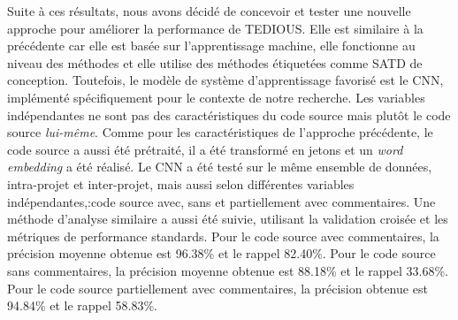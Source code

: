 Suite \`{a} ces r\'{e}sultats, nous avons d\'{e}cid\'{e} de concevoir et tester une nouvelle approche pour am\'{e}liorer la performance de \ac{TEDIOUS}. Elle est similaire \`{a} la pr\'{e}c\'{e}dente car elle est bas\'{e}e sur l'apprentissage machine, elle fonctionne au niveau des m\'{e}thodes et elle utilise des m\'{e}thodes \'{e}tiquet\'{e}es comme \ac{SATD} de conception. Toutefois, le mod\`{e}le de syst\`{e}me d'apprentissage favoris\'{e} est le \ac{CNN}, impl\'{e}ment\'{e} sp\'{e}cifiquement pour le contexte de notre recherche. Les variables ind\'{e}pendantes ne sont pas des caract\'{e}ristiques du code source mais plut\^{o}t le code source \emph{lui-m\^{e}me}. Comme pour les caract\'{e}ristiques de l'approche pr\'{e}c\'{e}dente, le code source a aussi \'{e}t\'{e} pr\'{e}trait\'{e}, il a \'{e}t\'{e} transform\'{e} en jetons et un \emph{word embedding} a \'{e}t\'{e} r\'{e}alis\'{e}. Le \ac{CNN} a \'{e}t\'{e} test\'{e} sur le m\^{e}me ensemble de donn\'{e}es, intra-projet et inter-projet, mais aussi selon diff\'{e}rentes variables ind\'{e}pendantes,:code source avec, sans et partiellement avec commentaires. Une m\'{e}thode d'analyse similaire a aussi \'{e}t\'{e} suivie, utilisant la validation crois\'{e}e et les m\'{e}triques de performance standards. Pour le code source avec commentaires, la pr\'{e}cision moyenne obtenue est 96.38\% et le rappel 82.40\%. Pour le code source sans commentaires, la pr\'{e}cision moyenne obtenue est 88.18\% et le rappel 33.68\%. Pour le code source partiellement avec commentaires, la pr\'{e}cision obtenue est 94.84\% et le rappel 58.83\%.


